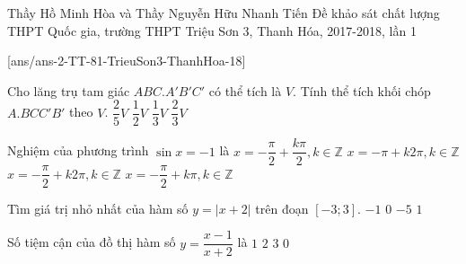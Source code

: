 \begin{name}
{Thầy Hồ Minh Hòa và Thầy Nguyễn Hữu Nhanh Tiến}
{Đề khảo sát chất lượng THPT Quốc gia, trường THPT Triệu Sơn 3, Thanh Hóa, 2017-2018, lần 1}
\end{name}
\setcounter{ex}{0}
[ans/ans-2-TT-81-TrieuSon3-ThanhHoa-18]
\begin{ex}%
Cho lăng trụ tam giác $ABC.A'B'C'$ có thể tích là $V$. Tính thể tích khối chóp $A.BCC'B'$ theo $V$.
\choice
{$\dfrac{2}{5}V$}
{$\dfrac{1}{2}V$}
{$\dfrac{1}{3}V$}
{\True $\dfrac{2}{3}V$}
\end{ex}
\begin{ex}%
Nghiệm của phương trình $\sin x=-1$ là
\choice
{$x=-\dfrac{\pi }{2}+\dfrac{k\pi }{2}, k\in \mathbb{Z}$}
{$x=-\pi +k2\pi , k\in \mathbb{Z}$}
{\True $x=-\dfrac{\pi }{2}+k2\pi , k\in \mathbb{Z}$}
{$x=-\dfrac{\pi }{2}+k\pi , k\in \mathbb{Z}$}
\end{ex}
\begin{ex}%
Tìm giá trị nhỏ nhất của hàm số $y=\left| x+2 \right|$ trên đoạn $\left[ -3;3 \right]$.
\choice
{$-1$}
{\True $0$}
{$-5$}
{$1$}
\end{ex}
\begin{ex}%
Số tiệm cận của đồ thị hàm số $y=\dfrac{x-1}{x+2}$ là
\choice
{$1$}
{\True $2$}
{$3$}
{$0$}
\end{ex}
